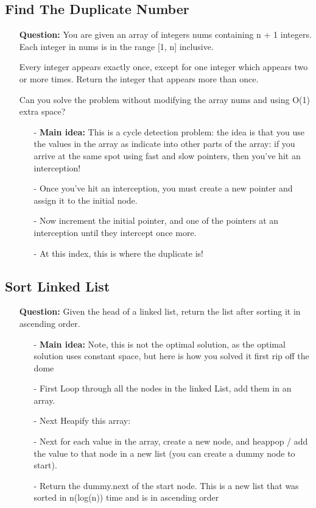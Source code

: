 \documentclass[12pt]{article}
\begin{document}
\subsection{Find The Duplicate Number}
\begin{enumerate}
  \item[] \textbf{Question:} You are given an array of integers nums containing n + 1 integers. Each integer in nums is in the range [1, n] inclusive.

Every integer appears exactly once, except for one integer which appears two or more times. Return the integer that appears more than once.

Can you solve the problem without modifying the array nums and using O(1) extra space?


    \begin{enumerate}
      \item[-] \textbf{Main idea:} This is a cycle detection problem: the idea is that you use the values in the array as indicate into other parts of the array: if you arrive at the same spot using fast and slow pointers, then you've hit an interception!
      \item[-] Once you've hit an interception, you must create a new pointer and assign it to the initial node.
      \item[-] Now increment the initial pointer, and one of the pointers at an interception until they intercept once more.
      \item[-] At this index, this is where the duplicate is!

    \end{enumerate}
\end{enumerate}


\subsection{Sort Linked List}
\begin{enumerate}
  \item[] \textbf{Question:} Given the head of a linked list, return the list after sorting it in ascending order.


    \begin{enumerate}
      \item[-] \textbf{Main idea:} Note, this is not the optimal solution, as the optimal solution uses constant space, but here is how you solved it first rip off the dome
      \item[-] First Loop through all the nodes in the linked List, add them in an array. 
      \item[-] Next Heapify this array:
      \item[-] Next for each value in the array, create a new node, and heappop / add the value to that node in a new list (you can create a dummy node to start).
      \item[-] Return the dummy.next of the start node. This is a new list that was sorted in n(log(n)) time and is in ascending order

    \end{enumerate}
\end{enumerate}
\end{document}
